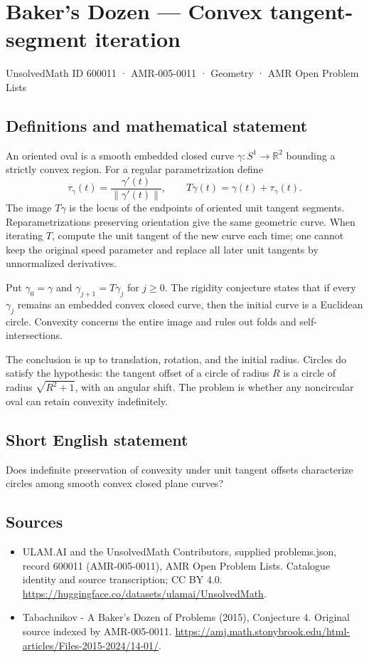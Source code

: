 \documentclass[11pt,a4paper]{article}
\begin{document}
\section*{Baker's Dozen — Convex tangent-segment iteration}\label{600011}
{\small UnsolvedMath ID 600011 · AMR-005-0011 · Geometry · AMR Open Problem Lists}
\subsection{Definitions and mathematical statement}
An oriented oval is a smooth embedded closed curve $\gamma:S^1\to\mathbb R^2$
bounding a strictly convex region. For a regular parametrization define
\[
 \tau_\gamma(t)=\frac{\gamma'(t)}{\|\gamma'(t)\|},\qquad
 T\gamma(t)=\gamma(t)+\tau_\gamma(t).
\]
The image $T\gamma$ is the locus of the endpoints of oriented unit tangent
segments. Reparametrizations preserving orientation give the same geometric
curve. When iterating $T$, compute the unit tangent of the new curve each
time; one cannot keep the original speed parameter and replace all later
unit tangents by unnormalized derivatives.

Put $\gamma_0=\gamma$ and $\gamma_{j+1}=T\gamma_j$ for $j\ge0$. The rigidity
conjecture states that if every $\gamma_j$ remains an embedded convex closed
curve, then the initial curve is a Euclidean circle. Convexity concerns the
entire image and rules out folds and self-intersections.

The conclusion is up to translation, rotation, and the initial radius.
Circles do satisfy the hypothesis: the tangent offset of a circle of radius
$R$ is a circle of radius $\sqrt{R^2+1}$, with an angular shift. The problem
is whether any noncircular oval can retain convexity indefinitely.
\subsection{Short English statement}
Does indefinite preservation of convexity under unit tangent offsets
characterize circles among smooth convex closed plane curves?
\subsection{Sources}
\begin{itemize}
\item[S1] ULAM.AI and the UnsolvedMath Contributors, supplied problems.json, record 600011 (AMR-005-0011), AMR Open Problem Lists. Catalogue identity and source transcription; CC BY 4.0.
\url{https://huggingface.co/datasets/ulamai/UnsolvedMath}.
\item[S2] Tabachnikov - A Baker's Dozen of Problems (2015), Conjecture 4. Original source indexed by AMR-005-0011.
\url{https://amj.math.stonybrook.edu/html-articles/Files-2015-2024/14-01/}.
\end{itemize}
\end{document}
